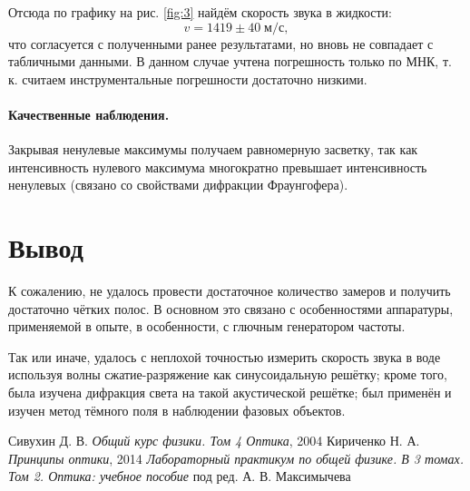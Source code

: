 \documentclass[a4paper]{article}
\begin{document}
Отсюда по графику на рис. \ref{fig:3} найдём скорость звука в жидкости: $$ v = 1419 \pm 40 \; м/с, $$ что согласуется с полученными ранее результатами, но вновь не совпадает с табличными данными. В данном случае учтена погрешность только по МНК, т. к. считаем инструментальные погрешности достаточно низкими.

\paragraph{Качественные наблюдения. } Закрывая ненулевые максимумы получаем равномерную засветку, так как интенсивность нулевого максимума многократно превышает интенсивность ненулевых (связано со свойствами дифракции Фраунгофера).

\section{Вывод}
К сожалению, не удалось провести достаточное количество замеров и получить достаточно чётких полос. В основном это связано с особенностями аппаратуры, применяемой в опыте, в особенности, с глючным генератором частоты. 

Так или иначе, удалось с неплохой точностью измерить скорость звука в воде используя волны сжатие-разряжение как синусоидальную решётку; кроме того, была изучена дифракция света на такой акустической решётке; был применён и изучен метод тёмного поля в наблюдении фазовых объектов.


\begin{thebibliography}{9}
	 Сивухин Д. В. \emph{Общий курс физики. Том 4 Оптика}, 2004
	 Кириченко Н. А. \emph{Принципы оптики}, 2014
	 \emph{Лабораторный практикум по общей физике. В 3 томах. Том 2. Оптика: учебное пособие} под ред. А. В. Максимычева
\end{thebibliography}
\end{document}

